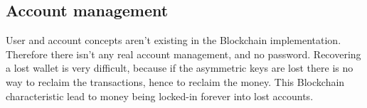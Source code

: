 \subsection{Account management}

User and account concepts aren't existing in the Blockchain implementation.
Therefore there isn't any real account management, and no password. Recovering a
lost wallet is very difficult, because if the asymmetric keys are lost there is
no way to reclaim the transactions, hence to reclaim the money. This Blockchain
characteristic lead to money being locked-in forever into lost accounts.
